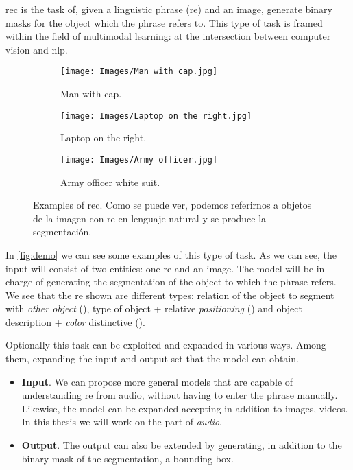 \gls{rec} is the task of, given a linguistic phrase (\gls{re}) and an image,
generate binary masks for the object which the phrase refers to. This type of
task is framed within the field of multimodal learning: at the intersection
between computer vision and \gls{nlp}.

\begin{figure}[ht]
  \centering
  \begin{subfigure}[t]{.32\textwidth}
    \centering
    \caption{Man with cap.}
    \texttt{[image: Images/Man with cap.jpg]}
  \end{subfigure}\hfill
  \begin{subfigure}[t]{.32\textwidth}
    \centering
    \caption{Laptop on the right.}
    \texttt{[image: Images/Laptop on the right.jpg]}
  \end{subfigure}\hfill
  \begin{subfigure}[t]{.32\textwidth}
    \centering
    \caption{Army officer white suit.}
    \texttt{[image: Images/Army officer.jpg]}
  \end{subfigure}
  \caption[Examples of \acl*{rec}]{Examples of \acl{rec}. Como se puede ver,
    podemos referirnos a objetos de la imagen con \gls{re} en lenguaje natural
    y se produce la segmentación.}
  \label{fig:demo}
\end{figure}

In \vref{fig:demo} we can see some examples of this type of task. As we can
see, the input will consist of two entities: one \gls{re} and an image. The
model will be in charge of generating the segmentation of the object to which
the phrase refers. We see that the \gls{re} shown are different types: relation
of the object to segment with \emph{other object} (), type
of object + relative \emph{positioning} () and object
description + \emph{color} distinctive ().

Optionally this task can be exploited and expanded in various ways. Among them,
expanding the input and output set that the model can obtain.
\begin{itemize}
  \item \textbf{Input}. We can propose more general models that are capable
  of understanding \gls{re} from audio, without having to enter the phrase
  manually. Likewise, the model can be expanded accepting in addition to
  images, videos. In this thesis we will work on the part of \emph{audio}.
  \item \textbf{Output}. The output can also be extended by generating, in
  addition to the binary mask of the segmentation, a bounding box.
\end{itemize}

